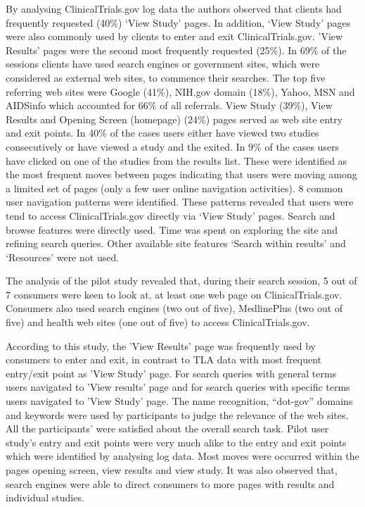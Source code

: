 \documentclass[]{article}
\begin{document}
By analysing ClinicalTrials.gov log data the authors observed that clients had frequently requested (40\%) ‘View Study' pages. In addition, ‘View Study' pages were also commonly used by clients to enter and exit ClinicalTrials.gov. 'View Results' pages were the second most frequently requested (25\%). In 69\% of the sessions clients have used search engines or government sites, which were considered as external web sites, to commence their searches. The top five referring web sites were Google (41\%), NIH.gov domain (18\%), Yahoo, MSN and AIDSinfo which accounted for 66\% of all referrals. View Study (39\%), View Results and Opening Screen (homepage)  (24\%) pages served as web site entry and exit points. In 40\% of the cases users either have viewed two studies consecutively or have viewed a study and the exited. In 9\% of the cases users have clicked on one of the studies from the results list. These were identified as the most frequent moves between pages indicating that users were moving among a limited set of pages (only a few user online navigation activities). 8 common user navigation patterns were identified. These patterns revealed that users were tend to access ClinicalTrials.gov directly via ‘View Study’ pages. Search and browse features were directly used. Time was spent on exploring the site and refining search queries. Other available site features ‘Search within results’ and ‘Resources’ were not used.

The analysis of the pilot study revealed that, during their search session, 5 out of 7 consumers were keen to look at, at least one web page on ClinicalTrials.gov. Consumers also used search engines (two out of five), MedlinePlus (two out of five) and health web sites (one out of five) to access ClinicalTrials.gov.   

According to this study, the 'View Results' page was frequently used by consumers to enter and exit, in contrast to TLA data with most frequent entry/exit point as 'View Study' page. For search queries with general terms users navigated to 'View results' page and for search queries with specific terms users navigated to 'View Study' page. The name recognition, “dot-gov” domains and keywords were used by participants to judge the relevance of the web sites. All the participants' were satisfied about the overall search task. Pilot user study's entry and exit points were very much alike to the entry and exit points which were identified by analysing log data. Most moves were occurred within the pages opening screen, view results and view study. It was also observed that, search engines were able to direct consumers to more pages with results and individual studies. 
\end{document}
